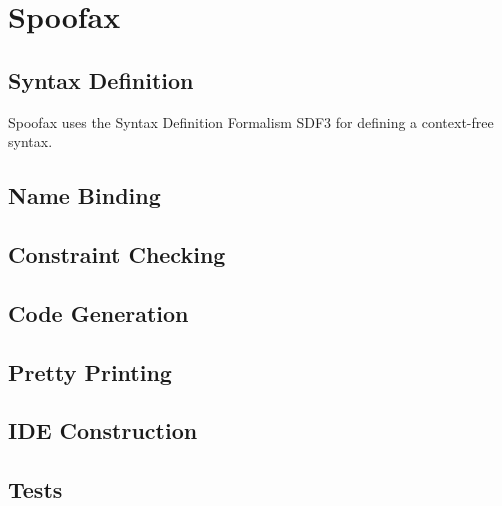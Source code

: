\section{Spoofax}

\subsection{Syntax Definition}

Spoofax uses the Syntax Definition Formalism SDF3 for defining a context-free syntax.



\subsection{Name Binding}



\subsection{Constraint Checking}



\subsection{Code Generation}



\subsection{Pretty Printing}



\subsection{IDE Construction}

\subsection{Tests}


